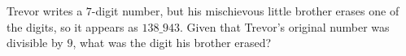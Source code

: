 Trevor writes a $7$-digit number, but his mischievous little brother erases one of the digits, so it appears as $138\_ 943$. Given that Trevor's original number was divisible by $9$, what was the digit his brother erased?
